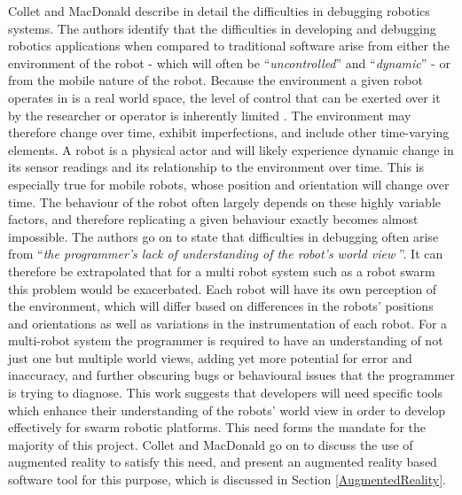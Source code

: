 Collet and MacDonald \cite{Collet:2006} describe in detail the difficulties in debugging robotics systems. The authors identify that the difficulties in developing and debugging robotics applications when compared to traditional software arise from either the environment of the robot - which will often be ``\textit{uncontrolled}'' and ``\textit{dynamic}'' - or from the mobile nature of the robot. Because the environment a given robot operates in is a real world space, the level of control that can be exerted over it by the researcher or operator is inherently limited \cite{Collet:2006}. The environment may therefore change over time, exhibit imperfections, and include other time-varying elements. A robot is a physical actor and will likely experience dynamic change in its sensor readings and its relationship to the environment over time. This is especially true for mobile robots, whose position and orientation will change over time. The behaviour of the robot often largely depends on these highly variable factors, and therefore replicating a given behaviour exactly becomes almost impossible. The authors go on to state that difficulties in debugging often arise from ``\textit{the programmer's lack of understanding of the robot's world view} \cite{Collet:2006}''. It can therefore be extrapolated that for a multi robot system such as a robot swarm this problem would be exacerbated. Each robot will have its own perception of the environment, which will differ based on differences in the robots' positions and orientations as well as variations in the instrumentation of each robot. For a multi-robot system the programmer is required to have an understanding of not just one but multiple world views, adding yet more potential for error and inaccuracy, and further obscuring bugs or behavioural issues that the programmer is trying to diagnose. This work \cite{Collet:2006} suggests that developers will need specific tools which enhance their understanding of the robots' world view in order to develop effectively for swarm robotic platforms. This need forms the mandate for the majority of this project. Collet and MacDonald \cite{Collet:2006} go on to discuss the use of augmented reality to satisfy this need, and present an augmented reality based software tool for this purpose, which is discussed in Section \ref{AugmentedReality}.

